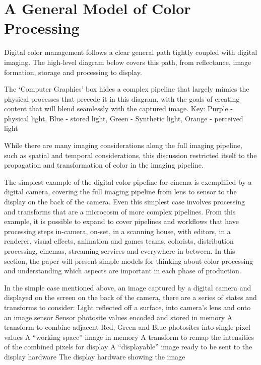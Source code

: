 \section{A General Model of Color Processing}
\label{sec:a-general-model-of-color-processing}

Digital color management follows a clear general path tightly coupled with digital imaging. The high-level diagram below covers this path, from reflectance, image formation, storage and processing to display.

The ‘Computer Graphics’ box hides a complex pipeline that largely mimics the physical processes that precede it in this diagram, with the goals of creating content that will blend seamlessly with the captured image. Key: Purple - physical light, Blue - stored light, Green - Synthetic light, Orange - perceived light

While there are many imaging considerations along the full imaging pipeline, such as spatial and temporal considerations, this discussion restricted itself to the propagation and transformation of color in the imaging pipeline.

The simplest example of the digital color pipeline for cinema is exemplified by a digital camera, covering the full imaging pipeline from lens to sensor to the display on the back of the camera. Even this simplest case involves processing and transforms that are a microcosm of more complex pipelines. From this example, it is possible to expand to cover pipelines and workflows that have processing steps in-camera, on-set, in a scanning house, with editors, in a renderer, visual effects, animation and games teams, colorists, distribution processing, cinemas, streaming services and everywhere in between. In this section, the paper will present simple models for thinking about color processing and understanding which aspects are important in each phase of production.

In the simple case mentioned above, an image captured by a digital camera and displayed on the screen on the back of the camera, there are a series of states and transforms to consider:
Light reflected off a surface, into camera’s lens and onto an image sensor
Sensor photosite values encoded and stored in memory
A transform to combine adjacent Red, Green and Blue photosites into single pixel values
A “working space” image in memory
A transform to remap the intensities of the combined pixels for display
A “displayable” image ready to be sent to the display hardware
The display hardware showing the image



